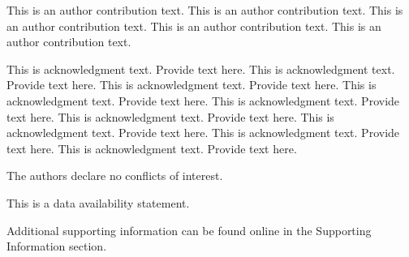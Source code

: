 \documentclass[ASNA,twocolumn]{USG} %
\begin{document}
{}

This is an author contribution text. This is an author contribution text. This is an author contribution text. This is an author contribution text. This is an author contribution text.

This is acknowledgment text. \cite{Kenamond2013} Provide text here. This is acknowledgment text. Provide text here. This is acknowledgment text. Provide text here. This is acknowledgment text. Provide text here. This is acknowledgment text. Provide text here. This is acknowledgment text. Provide text here. This is acknowledgment text. Provide text here. This is acknowledgment text. Provide text here. This is acknowledgment text. Provide text here.



The authors declare no conflicts of interest.


This is a data availability statement.




Additional supporting information can be found online in the Supporting Information
section.






\nocite{*}%
\end{document}
